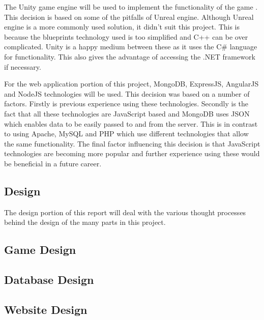 \documentclass[12pt]{article}
\begin{document}
The Unity game engine will be used to implement the functionality of the game . This decision is based on some of the pitfalls of Unreal engine. Although Unreal engine is a more commonly used solution, it didn't suit this project. This is because the blueprints technology used is too simplified and C++ can be over complicated. Unity is a happy medium between these as it uses the C{\#} language for functionality. This also gives the advantage of accessing the .NET framework if necessary. 

For the web application portion of this project, MongoDB, ExpressJS, AngularJS and NodeJS technologies will be used. This decision was based on a number of factors. Firstly is previous experience using these technologies. Secondly is the fact that all these technologies are JavaScript based and MongoDB uses JSON which enables data to be easily passed to and from the server. This is in contrast to using Apache, MySQL and PHP which use different technologies that allow the same functionality. The final factor influencing this decision is that JavaScript technologies are becoming more popular and further experience using these would be beneficial in a future career. 

\newpage
\begin{center}
\section{Design}
\end{center}
The design portion of this report will deal with the various thought processes behind the design of the many parts in this project. 

\begin{center}
\subsection{Game Design}
\end{center}

\begin{center}
\subsection{Database Design}
\end{center}

\begin{center}
\subsection{Website Design}
\end{center}
\end{document}
